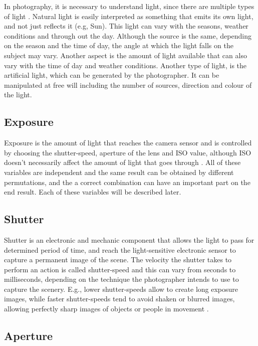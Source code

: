 In photography, it is necessary to understand light, since there are multiple types of light \cite{Santos}. Natural light is easily interpreted as something that emits its own light, and not just reflects it (e.g, Sun). This light can vary with the seasons, weather conditions and through out the day. Although the source is the same, depending on the season and the time of day, the angle at which the light falls on the subject may vary. Another aspect is the amount of light available that can also vary with the time of day and weather conditions.
Another type of light, is the artificial light, which can be generated by the photographer. It can be manipulated at free will including the number of sources, direction and colour of the light.


\subsection{Exposure}
\label{sub:exposure}

Exposure is the amount of light that reaches the camera sensor and is controlled by choosing the shutter-speed, aperture of the lens and ISO value, although ISO doesn't necessarily affect the amount of light that goes through \cite{kamps2012rules, Santos}. All of these variables are independent and the same result can be obtained by different permutations, and the a correct combination can have an important part on the end result. Each of these variables will be described later.

\subsection{Shutter}
\label{sub:shutter}

Shutter is an electronic and mechanic component that allows the light to pass for determined period of time, and reach the light-sensitive electronic sensor to capture a permanent image of the scene. The velocity the shutter takes to perform an action is called shutter-speed and this can vary from seconds to milliseconds, depending on the technique the photographer intends to use to capture the scenery. E.g., lower shutter-speeds allow to create long exposure images, while faster shutter-speeds tend to avoid shaken or blurred images, allowing perfectly sharp images of objects or people in movement \cite{Santos}.

\subsection{Aperture}
\label{sub:aperture}

